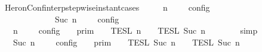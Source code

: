 \begin{isabellebody}
\endisatagproof
{\isafoldproof}%
%
\isadelimproof
\isanewline
%
\endisadelimproof
\isanewline
{}\isamarkupfalse%
\ HeronConf{\isacharunderscore}interp{\isacharunderscore}stepwise{\isacharunderscore}instant{\isacharunderscore}cases{\isacharcolon}\isanewline
\ \ \ {\isacartoucheopen}{\isasymlbrakk}\ {\isasymGamma}{\isacharcomma}\ n\ {\isasymturnstile}\ {\isacharbrackleft}{\isacharbrackright}\ {\isasymtriangleright}\ {\isasymPhi}\ {\isasymrbrakk}\isactrlsub c\isactrlsub o\isactrlsub n\isactrlsub f\isactrlsub i\isactrlsub g\isanewline
\ \ \ \ \ \ \ \ \ \ {\isacharequal}\ {\isasymlbrakk}\ {\isasymGamma}{\isacharcomma}\ Suc\ n\ {\isasymturnstile}\ {\isasymPhi}\ {\isasymtriangleright}\ {\isacharbrackleft}{\isacharbrackright}\ {\isasymrbrakk}\isactrlsub c\isactrlsub o\isactrlsub n\isactrlsub f\isactrlsub i\isactrlsub g{\isacartoucheclose}\isanewline
%
\isadelimproof
\ \ %
\endisadelimproof
%
\isatagproof
{}\isamarkupfalse%
\ {\isacharminus}\isanewline
\ \ \ \ \isamarkupfalse%
\ {\isacartoucheopen}{\isasymlbrakk}\ {\isasymGamma}{\isacharcomma}\ n\ {\isasymturnstile}\ {\isacharbrackleft}{\isacharbrackright}\ {\isasymtriangleright}\ {\isasymPhi}\ {\isasymrbrakk}\isactrlsub c\isactrlsub o\isactrlsub n\isactrlsub f\isactrlsub i\isactrlsub g\ {\isacharequal}\ {\isasymlbrakk}{\isasymlbrakk}\ {\isasymGamma}\ {\isasymrbrakk}{\isasymrbrakk}\isactrlsub p\isactrlsub r\isactrlsub i\isactrlsub m\ {\isasyminter}\ {\isasymlbrakk}{\isasymlbrakk}\ {\isacharbrackleft}{\isacharbrackright}\ {\isasymrbrakk}{\isasymrbrakk}\isactrlsub T\isactrlsub E\isactrlsub S\isactrlsub L\isactrlbsup {\isasymge}\ n\isactrlesup \ {\isasyminter}\ {\isasymlbrakk}{\isasymlbrakk}\ {\isasymPhi}\ {\isasymrbrakk}{\isasymrbrakk}\isactrlsub T\isactrlsub E\isactrlsub S\isactrlsub L\isactrlbsup {\isasymge}\ Suc\ n\isactrlesup {\isacartoucheclose}\isanewline
\ \ \ \ \ \ \isamarkupfalse%
\ simp\isanewline
\ \ \ \ \isamarkupfalse%
\ \isamarkupfalse%
\ {\isacartoucheopen}{\isasymlbrakk}\ {\isasymGamma}{\isacharcomma}\ Suc\ n\ {\isasymturnstile}\ {\isasymPhi}\ {\isasymtriangleright}\ {\isacharbrackleft}{\isacharbrackright}\ {\isasymrbrakk}\isactrlsub c\isactrlsub o\isactrlsub n\isactrlsub f\isactrlsub i\isactrlsub g\ {\isacharequal}\ {\isasymlbrakk}{\isasymlbrakk}\ {\isasymGamma}\ {\isasymrbrakk}{\isasymrbrakk}\isactrlsub p\isactrlsub r\isactrlsub i\isactrlsub m\ {\isasyminter}\ {\isasymlbrakk}{\isasymlbrakk}\ {\isasymPhi}\ {\isasymrbrakk}{\isasymrbrakk}\isactrlsub T\isactrlsub E\isactrlsub S\isactrlsub L\isactrlbsup {\isasymge}\ Suc\ n\isactrlesup \ {\isasyminter}\ {\isasymlbrakk}{\isasymlbrakk}\ {\isacharbrackleft}{\isacharbrackright}\ {\isasymrbrakk}{\isasymrbrakk}\isactrlsub T\isactrlsub E\isactrlsub S\isactrlsub L\isactrlbsup {\isasymge}\ Suc\ n\isactrlesup {\isacartoucheclose}\isanewline

\end{isabellebody}
